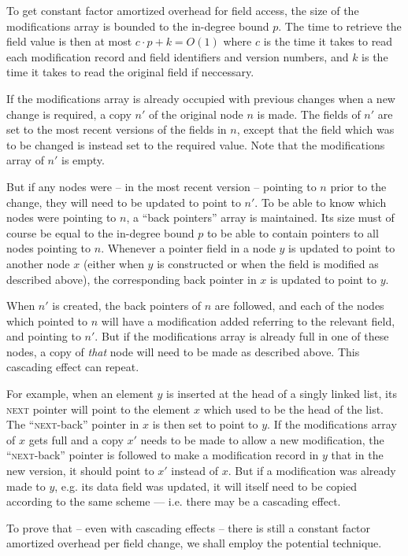 To get constant factor amortized overhead for field access, the size of the
modifications array is bounded to the in-degree bound $p$. The time to retrieve
the field value is then at most $c \cdot p + k = O(1)$ where $c$ is the time it
takes to read each modification record and field identifiers and version
numbers, and $k$ is the time it takes to read the original field if neccessary.

If the modifications array is already occupied with previous changes when a new
change is required, a copy $n'$ of the original node $n$ is made. The fields of
$n'$ are set to the most recent versions of the fields in $n$, except that the
field which was to be changed is instead set to the required value. Note that
the modifications array of $n'$ is empty.

But if any nodes were -- in the most recent version -- pointing to $n$ prior to
the change, they will need to be updated to point to $n'$. To be able to know
which nodes were pointing to $n$, a ``back pointers'' array is maintained. Its
size must of course be equal to the in-degree bound $p$ to be able to contain
pointers to all nodes pointing to $n$. Whenever a pointer field in a node $y$ is
updated to point to another node $x$ (either when $y$ is constructed or when the
field is modified as described above), the corresponding back pointer in $x$ is
updated to point to $y$.

When $n'$ is created, the back pointers of $n$ are followed, and each of the
nodes which pointed to $n$ will have a modification added referring to the
relevant field, and pointing to $n'$. But if the modifications array is already
full in one of these nodes, a copy of \emph{that} node will need to be made as
described above. This cascading effect can repeat.

For example, when an element $y$ is inserted at the head of a singly linked
list, its \textsc{next} pointer will point to the element $x$ which used to be
the head of the list. The ``\textsc{next}-back'' pointer in $x$ is then set to
point to $y$. If the modifications array of $x$ gets full and a copy $x'$ needs
to be made to allow a new modification, the ``\textsc{next}-back'' pointer is
followed to make a modification record in $y$ that in the new version, it should
point to $x'$ instead of $x$. But if a modification was already made to $y$,
e.g. its data field was updated, it will itself need to be copied according to
the same scheme --- i.e. there may be a cascading effect.

To prove that -- even with cascading effects -- there is still a constant factor
amortized overhead per field change, we shall employ the potential technique.

